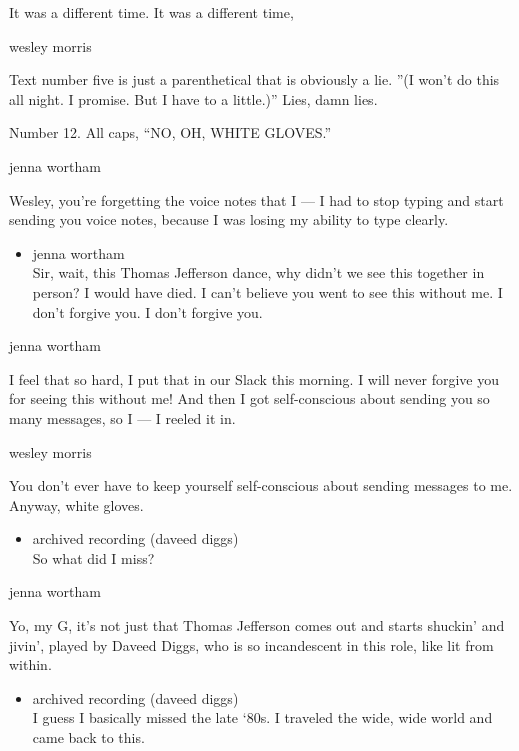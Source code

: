 It was a different time. It was a different time,

wesley morris

Text number five is just a parenthetical that is obviously a lie. ''(I
won't do this all night. I promise. But I have to a little.)'' Lies,
damn lies.

Number 12. All caps, ``NO, OH, WHITE GLOVES.''

jenna wortham

Wesley, you're forgetting the voice notes that I --- I had to stop
typing and start sending you voice notes, because I was losing my
ability to type clearly.

\begin{itemize}
\tightlist
\item
  jenna wortham\\
  Sir, wait, this Thomas Jefferson dance, why didn't we see this
  together in person? I would have died. I can't believe you went to see
  this without me. I don't forgive you. I don't forgive you.
\end{itemize}

jenna wortham

I feel that so hard, I put that in our Slack this morning. I will never
forgive you for seeing this without me! And then I got self-conscious
about sending you so many messages, so I --- I reeled it in.

wesley morris

You don't ever have to keep yourself self-conscious about sending
messages to me. Anyway, white gloves.

\begin{itemize}
\tightlist
\item
  archived recording (daveed diggs)\\
  So what did I miss?
\end{itemize}

jenna wortham

Yo, my G, it's not just that Thomas Jefferson comes out and starts
shuckin' and jivin', played by Daveed Diggs, who is so incandescent in
this role, like lit from within.

\begin{itemize}
\tightlist
\item
  archived recording (daveed diggs)\\
  I guess I basically missed the late `80s. I traveled the wide, wide
  world and came back to this.
\end{itemize}

